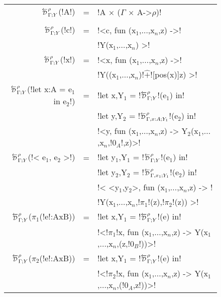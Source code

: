 \begin{figure*}[t]
    \small
    \begin{tabular}{|r c l|}
    \hline
        $\directD{\rho}{\Gamma}{Y}$(!A!) &=& !A $\times$ ($\Gamma$ $\times$ A->$\rho$)!\\ & & \\
        $\directD{\rho}{\Gamma}{Y}$(!c!) &=& 
            !<c, fun (x$_{1}$,$\ldots$,x$_n$,z) ->! \\
            && !Y(x$_{1}$,$\ldots$,x$_{n}$) >!\\
        $\directD{\rho}{\Gamma}{Y}$(!x!) &=& 
            !<x, fun (x$_{1}$,$\ldots$,x$_n$,z) ->! \\
            && !Y((x$_{1}$,$\ldots$,x$_n$)!$\widehat{+}$![pos(x)]z) >!\\
        $\directD{\rho}{\Gamma}{Y}$(!let x:A = e$_{1}$ in e$_{2}$!) &=& 
            !let x,Y$_{1}$ = !$\directD{\rho}{\Gamma}{Y}$!(e$_{1}$) in! \\
            &&!let y,Y$_{2}$ = !$\directD{\rho}{\Gamma,x:A}{Y_1}$!(e$_{2}$) in!\\ 
            &&!<y, fun (x$_{1}$,$\ldots$,x$_n$,z) -> Y$_{2}$(x$_{1}$,$\ldots$,x$_n$,!$0_{A}$!,z)>!\\
        $\directD{\rho}{\Gamma}{Y}$(!< e$_{1}$, e$_{2}$ >!) &=&
            !let y$_{1}$,Y$_{1}$ = !$\directD{\rho}{\Gamma}{Y}$!(e$_{1}$) in! \\
            &&!let y$_{2}$,Y$_{2}$ = !$\directD{\rho}{\Gamma,x_1}{Y_1}$!(e$_{2}$) in!\\
            &&!< <y$_{1}$,y$_{2}$>, fun (x$_{1}$,$\ldots$,x$_n$,z) -> !\\
            &&!Y(x$_{1}$,$\ldots$,x$_n$,!$\pi_1$!(z),!$\pi_2$!(z)) >!\\ 
        $\directD{\rho}{\Gamma}{Y}$($\pi_1$(!e!:AxB)) &=&
            !let x,Y$_{1}$ = !$\directD{\rho}{\Gamma}{Y}$!(e) in! \\
            && !<!$\pi_1$!x, fun (x$_{1}$,$\ldots$,x$_n$,z) -> Y(x$_{1}$,$\ldots$,x$_n$,(z,!$0_B$!))>! \\
        $\directD{\rho}{\Gamma}{Y}$($\pi_2$(!e!:AxB)) &=&
            !let x,Y$_{1}$ = !$\directD{\rho}{\Gamma}{Y}$!(e) in! \\
            && !<!$\pi_2$!x, fun (x$_{1}$,$\ldots$,x$_n$,z) -> Y(x$_{1}$,$\ldots$,x$_n$,(!$0_A$,z!))>! \\

\end{tabular}
\end{figure*}
